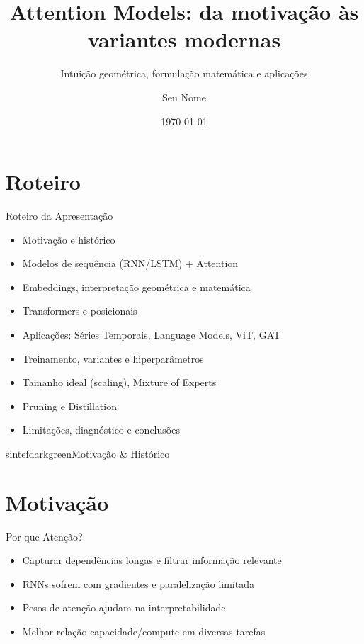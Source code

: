\documentclass{beamer}
\title{Attention Models: da motivação às variantes modernas}
\subtitle{Intuição geométrica, formulação matemática e aplicações}
\author{Seu Nome}
\date{\today}
\begin{document}
\maketitle

\section{Roteiro}
\begin{frame}{Roteiro da Apresentação}
\begin{itemize}[<+->]
  \item Motivação e histórico
  \item Modelos de sequência (RNN/LSTM) + Attention
  \item Embeddings, interpretação geométrica e matemática
  \item Transformers e posicionais
  \item Aplicações: Séries Temporais, Language Models, ViT, GAT
  \item Treinamento, variantes e hiperparâmetros
  \item Tamanho ideal (scaling), Mixture of Experts
  \item Pruning e Distillation
  \item Limitações, diagnóstico e conclusões
\end{itemize}
\end{frame}

\begin{chapter}{sintefdarkgreen}{Motivação \& Histórico}\end{chapter}

\section{Motivação}
\begin{frame}{Por que Atenção?}
\begin{itemize}[<+->]
  \item Capturar dependências longas e filtrar informação relevante
  \item RNNs sofrem com gradientes e paralelização limitada
  \item Pesos de atenção ajudam na interpretabilidade
  \item Melhor relação capacidade/compute em diversas tarefas
\end{itemize}
\end{frame}
\end{document}
